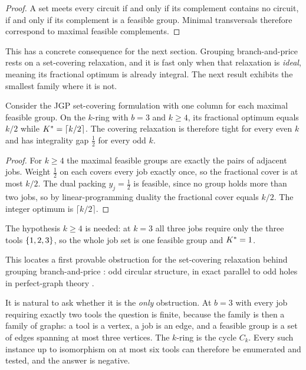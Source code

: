 \begin{proof}
A set meets every circuit if and only if its complement contains no circuit, if and
only if its complement is a feasible group. Minimal transversals therefore correspond
to maximal feasible complements.
\end{proof}

This has a concrete consequence for the next section. Grouping branch-and-price rests
on a set-covering relaxation, and it is fast only when that relaxation is
\emph{ideal}, meaning its fractional optimum is already integral. The next result
exhibits the smallest family where it is not.

\begin{proposition}\label{prop:oddring}
Consider the JGP set-covering formulation with one column for each maximal feasible
group. On the $k$-ring with $b=3$ and $k\ge4$, its fractional optimum equals $k/2$ while
$K^{\ast}=\lceil k/2\rceil$. The covering relaxation is therefore tight for every even
$k$ and has integrality gap $\tfrac12$ for every odd $k$.
\end{proposition}

\begin{proof}
For $k\ge4$ the maximal feasible groups are exactly the pairs of adjacent jobs.
Weight $\tfrac12$ on each covers every job exactly once, so the fractional cover is at
most $k/2$. The dual packing $y_j=\tfrac12$ is feasible, since no group holds more than
two jobs, so by linear-programming duality the fractional cover equals $k/2$. The
integer optimum is $\lceil k/2\rceil$.
\end{proof}

The hypothesis $k\ge4$ is needed: at $k=3$ all three jobs require only the three tools
$\{1,2,3\}$, so the whole job set is one feasible group and $K^{\ast}=1$.

This locates a first provable obstruction for the set-covering relaxation behind
grouping branch-and-price \citep{Crama1994Column,Otiai2026}: odd circular structure,
in exact parallel to odd holes in perfect-graph theory \citep{Chudnovsky2006}.

It is natural to ask whether it is the \emph{only} obstruction. At $b=3$ with every job
requiring exactly two tools the question is finite, because the family is then a family
of graphs: a tool is a vertex, a job is an edge, and a feasible group is a set of edges
spanning at most three vertices. The $k$-ring is the cycle $C_k$. Every such instance up
to isomorphism on at most six tools can therefore be enumerated and tested, and the
answer is negative.

